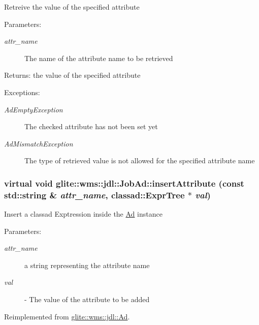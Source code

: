Retreive the value of the specified attribute \begin{Desc}
\item[Parameters:]
\begin{description}
\item[{\em attr\_\-name}]The name of the attribute name to be retrieved \end{description}
\end{Desc}
\begin{Desc}
\item[Returns:]the value of the specified attribute \end{Desc}
\begin{Desc}
\item[Exceptions:]
\begin{description}
\item[{\em Ad\-Empty\-Exception}]The checked attribute has not been set yet \item[{\em Ad\-Mismatch\-Exception}]The type of retrieved value is not allowed for the specified attribute name \end{description}
\end{Desc}
\hypertarget{classglite_1_1wms_1_1jdl_1_1JobAd_b2}{
\subsubsection[insertAttribute]{\setlength{\rightskip}{0pt plus 5cm}virtual void glite::wms::jdl::Job\-Ad::insert\-Attribute (const std::string \& {\em attr\_\-name}, classad::Expr\-Tree $\ast$ {\em val})}}
\label{classglite_1_1wms_1_1jdl_1_1JobAd_b2}


Insert a classad Exptression inside the \hyperlink{classglite_1_1wms_1_1jdl_1_1Ad}{Ad} instance \begin{Desc}
\item[Parameters:]
\begin{description}
\item[{\em attr\_\-name}]a string representing the attribute name \item[{\em val}]- The value of the attribute to be added\end{description}
\end{Desc}


Reimplemented from \hyperlink{classglite_1_1wms_1_1jdl_1_1Ad_b2}{glite::wms::jdl::Ad}.

